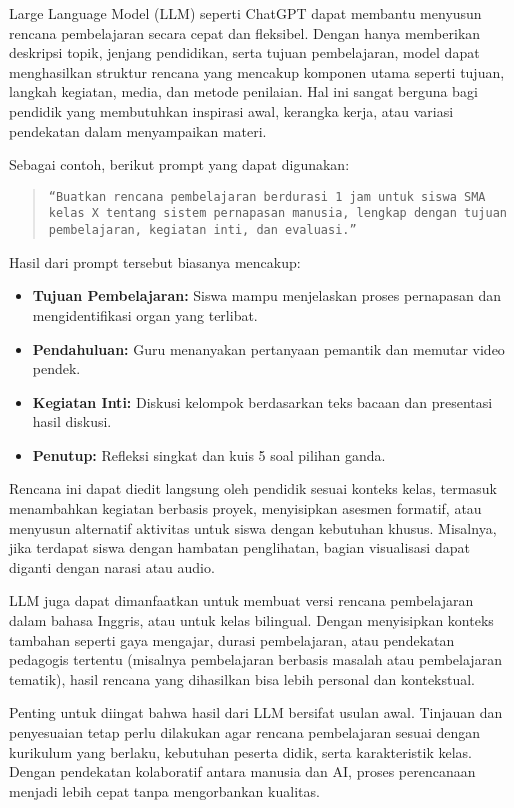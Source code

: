Large Language Model (LLM) seperti ChatGPT dapat membantu menyusun rencana pembelajaran secara cepat dan fleksibel. Dengan hanya memberikan deskripsi topik, jenjang pendidikan, serta tujuan pembelajaran, model dapat menghasilkan struktur rencana yang mencakup komponen utama seperti tujuan, langkah kegiatan, media, dan metode penilaian. Hal ini sangat berguna bagi pendidik yang membutuhkan inspirasi awal, kerangka kerja, atau variasi pendekatan dalam menyampaikan materi.

Sebagai contoh, berikut prompt yang dapat digunakan:
\begin{quote}
	\centering
		\texttt{“Buatkan rencana pembelajaran berdurasi 1 jam untuk siswa SMA kelas X tentang sistem pernapasan manusia, lengkap dengan tujuan pembelajaran, kegiatan inti, dan evaluasi.”}
\end{quote}

Hasil dari prompt tersebut biasanya mencakup:
\begin{itemize}
	\item \textbf{Tujuan Pembelajaran:} Siswa mampu menjelaskan proses pernapasan dan mengidentifikasi organ yang terlibat.
	\item \textbf{Pendahuluan:} Guru menanyakan pertanyaan pemantik dan memutar video pendek.
	\item \textbf{Kegiatan Inti:} Diskusi kelompok berdasarkan teks bacaan dan presentasi hasil diskusi.
	\item \textbf{Penutup:} Refleksi singkat dan kuis 5 soal pilihan ganda.
\end{itemize}

Rencana ini dapat diedit langsung oleh pendidik sesuai konteks kelas, termasuk menambahkan kegiatan berbasis proyek, menyisipkan asesmen formatif, atau menyusun alternatif aktivitas untuk siswa dengan kebutuhan khusus. Misalnya, jika terdapat siswa dengan hambatan penglihatan, bagian visualisasi dapat diganti dengan narasi atau audio.

LLM juga dapat dimanfaatkan untuk membuat versi rencana pembelajaran dalam bahasa Inggris, atau untuk kelas bilingual. Dengan menyisipkan konteks tambahan seperti gaya mengajar, durasi pembelajaran, atau pendekatan pedagogis tertentu (misalnya pembelajaran berbasis masalah atau pembelajaran tematik), hasil rencana yang dihasilkan bisa lebih personal dan kontekstual.

Penting untuk diingat bahwa hasil dari LLM bersifat usulan awal. Tinjauan dan penyesuaian tetap perlu dilakukan agar rencana pembelajaran sesuai dengan kurikulum yang berlaku, kebutuhan peserta didik, serta karakteristik kelas. Dengan pendekatan kolaboratif antara manusia dan AI, proses perencanaan menjadi lebih cepat tanpa mengorbankan kualitas.

